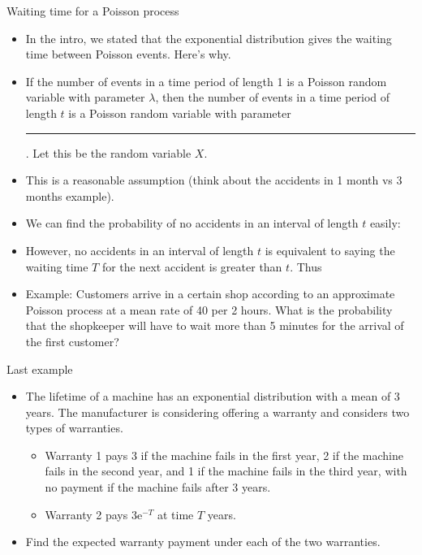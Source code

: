 \documentclass{article}
\newcommand{\blankul}[1]{\rule[-1.5mm]{#1}{0.15mm}}	%
\newcommand{\e}{\mathrm{e}}		%
\begin{document}
Waiting time for a Poisson process\bigskip
\begin{itemize}
    \item In the intro, we stated that the exponential distribution gives the waiting time between Poisson events. Here's why.
    \item If the number of events in a time period of length 1 is a Poisson random variable with parameter $\lambda$, then the number of events in a time period of length $t$ is a Poisson random variable with parameter \blankul{1cm}. Let this be the random variable $X$.
    \item[] This is a reasonable assumption (think about the accidents in 1 month vs 3 months example).
    \item We can find the probability of no accidents in an interval of length $t$ easily:\vspace{30pt}
    \item[] However, no accidents in an interval of length $t$ is equivalent to saying the waiting time $T$ for the next accident is greater than $t$. Thus\vspace{30pt}
    \item Example: Customers arrive in a certain shop according to an approximate Poisson process at a mean rate of 40 per 2 hours. What is the probability that the shopkeeper will have to wait more than 5 minutes for the arrival of the first customer?\vspace{80pt}
\end{itemize}\bigskip

Last example\bigskip
\begin{itemize}
    \item The lifetime of a machine has an exponential distribution with a mean of 3 years. The manufacturer is considering offering a warranty and considers two types of warranties.
    \begin{itemize}
        \item Warranty 1 pays 3 if the machine fails in the first year, 2 if the machine fails in the second year, and 1 if the machine fails in the third year, with no payment if the machine fails after 3 years.
        \item Warranty 2 pays $3\e^{-T}$ at time $T$ years.
    \end{itemize}
    \item[] Find the expected warranty payment under each of the two warranties.\vspace{150pt}
\end{itemize}
\end{document}
